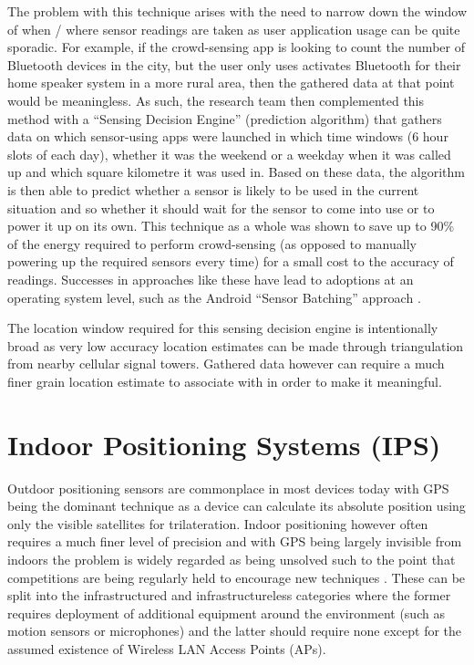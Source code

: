 \documentclass{UoYCSproject}
\begin{document}
            The problem with this technique arises with the need to narrow down the window of when / where sensor readings are taken as user application usage can be quite sporadic. For example, if the crowd-sensing app is looking to count the number of Bluetooth devices in the city, but the user only uses activates Bluetooth for their home speaker system in a more rural area, then the gathered data at that point would be meaningless. As such, the research team then complemented this method with a ``Sensing Decision Engine'' (prediction algorithm) that gathers data on which sensor-using apps were launched in which time windows (6 hour slots of each day), whether it was the weekend or a weekday when it was called up and which square kilometre it was used in. Based on these data, the algorithm is then able to predict whether a sensor is likely to be used in the current situation and so whether it should wait for the sensor to come into use or to power it up on its own. This technique as a whole was shown to save up to 90\% of the energy required to perform crowd-sensing (as opposed to manually powering up the required sensors every time) for a small cost to the accuracy of readings. Successes in approaches like these have lead to adoptions at an operating system level, such as the Android ``Sensor Batching'' approach \citep{AndroidSenseBatch}.
            
            The location window required for this sensing decision engine is intentionally broad as very low accuracy location estimates can be made through triangulation from nearby cellular signal towers. Gathered data however can require a much finer grain location estimate to associate with in order to make it meaningful.
                
        \section{Indoor Positioning Systems (IPS)}
        \label{sec:ips}
        
            Outdoor positioning sensors are commonplace in most devices today with GPS being the dominant technique as a device can calculate its absolute position using only the visible satellites for trilateration. Indoor positioning however often requires a much finer level of precision and with GPS being largely invisible from indoors the problem is widely regarded as being unsolved such to the point that competitions are being regularly held to encourage new techniques \citep{MSLOCComp}. These can be split into  the infrastructured and infrastructureless categories where the former requires deployment of additional equipment around the environment (such as motion sensors or microphones) and the latter should require none except for the assumed existence of Wireless LAN Access Points (APs).
            
\end{document}
